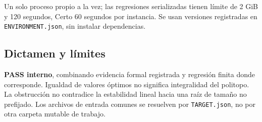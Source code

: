 Un solo proceso propio a la vez; las regresiones serializadas tienen
límite de 2 GiB y 120 segundos, Certo 60 segundos por instancia. Se usan
versiones registradas en \texttt{ENVIRONMENT.json}, sin instalar
dependencias.

\subsection{Dictamen y límites}\label{dictamen-y-luxedmites}

\textbf{PASS interno}, combinando evidencia formal registrada y
regresión finita donde corresponde. Igualdad de valores óptimos no
significa integralidad del politopo. La obstrucción no contradice la
estabilidad lineal hacia una raíz de tamaño no prefijado. Los archivos
de entrada comunes se resuelven por \texttt{TARGET.json}, no por otra
carpeta mutable de trabajo.

